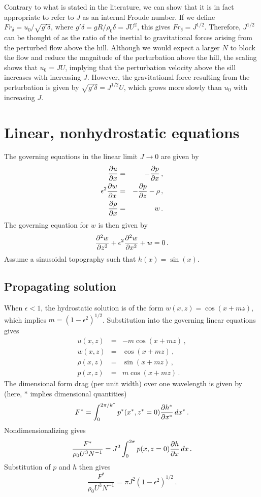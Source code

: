 \documentclass[12pt]{article}
\begin{document}
Contrary to what is stated in the literature, we can show that it is
in fact appropriate to refer to $J$ as an internal Froude number. If we define
$Fr_\delta = u_0/\sqrt{g' \delta}$, where $g'\delta =g R/\rho_0 \delta = J U^2$, this gives
$Fr_{\delta} = J^{1/2}$. Therefore, $J^{1/2}$ can be thought of as 
the ratio of the inertial to gravitational forces arising from the perturbed
flow above the hill. Although we would expect a larger $N$ to block the flow and
reduce the magnitude of the perturbation above the hill, the scaling shows that
$u_0 = J U$, implying that the perturbation velocity above the sill increases with
increasing $J$. However, the gravitational force resulting from the perturbation is
given by $\sqrt{g'\delta} = J^{1/2} U$, which grows more slowly than $u_0$ with
increasing $J$.

\section{Linear, nonhydrostatic equations}

The governing equations in the linear limit $J\to 0$ are given by
\begin{eqnarray*}
\frac{\partial{u}}{\partial{x}} &=& -\frac{\partial{p}}{\partial{x}}\,,\\
\epsilon^2 \frac{\partial{w}}{\partial{x}} &=& -\frac{\partial{p}}{\partial{z}} - \rho\,,\\
\frac{\partial{\rho}}{\partial{x}} &=& w\,.
\end{eqnarray*}
The governing equation for $w$ is then given by
\[ 
\frac{\partial^{2}{w}}{\partial{z}^{2}} + \epsilon^2 \frac{\partial^{2}{w}}{\partial{x}^{2}} + w = 0\,.
\]
Assume a sinusoidal topography such that $h(x) = \sin(x)$.

\subsection{Propagating solution}

When $\epsilon<1$, the hydrostatic solution is of the form
$w(x,z) = \cos(x + m z)$, which implies $m = (1-\epsilon^2)^{1/2}$.  Substitution into
the governing linear equations gives
\begin{eqnarray*}
u(x,z) &=& -m \cos(x + m z)\,,\\
w(x,z) &=& \cos(x + m z)\,,\\
\rho(x,z) &=& \sin(x + m z)\,,\\
p(x,z) &=& m \cos(x + m z)\,.
\end{eqnarray*}
The dimensional form drag (per unit width) over one wavelength is given by (here, $*$ implies dimensional
quantities)
\[
F^* = \int_{0}^{2\pi/k^*} p^*(x^*,z^*=0)\frac{\partial{h^*}}{\partial{x^*}}\, dx^*\,.
\]
Nondimensionalizing gives
\[
\frac{F^*}{\rho_0 U^3 N^{-1}} = J^2 \int_{0}^{2\pi} p(x,z=0)\frac{\partial{h}}{\partial{x}}\, dx\,.
\]
Substitution of $p$ and $h$ then gives
\[
\frac{F^*}{\rho_0 U^3 N^{-1}} = \pi J^2\left(1 - \epsilon^2\right)^{1/2}\,.
\]
\end{document}

